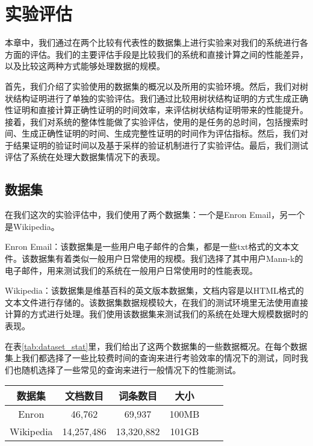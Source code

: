 \chapter{实验评估}
\label{chap:evaluation}
本章中，我们通过在两个比较有代表性的数据集上进行实验来对我们的系统进行各方面的评估。我们的主要评估手段是比较我们的系统和直接计算之间的性能差异，以及比较这两种方式能够处理数据的规模。

首先，我们介绍了实验使用的数据集的概况以及所用的实验环境。然后，我们对树状结构证明进行了单独的实验评估。我们通过比较用树状结构证明的方式生成正确性证明和直接计算正确性证明的时间效率，来评估树状结构证明带来的性能提升。接着，我们对系统的整体性能做了实验评估，使用的是任务的总时间，包括搜索时间、生成正确性证明的时间、生成完整性证明的时间作为评估指标。然后，我们对于结果证明的验证时间以及基于采样的验证机制进行了实验评估。最后，我们测试评估了系统在处理大数据集情况下的表现。

\section{数据集}

在我们这次的实验评估中，我们使用了两个数据集：一个是Enron Email，另一个是Wikipedia。

Enron Email：该数据集是一些用户电子邮件的合集，都是一些txt格式的文本文件。该数据集有着类似一般用户日常使用的规模。我们选择了其中用户Mann-k的电子邮件，用来测试我们的系统在一般用户日常使用时的性能表现。

Wikipedia：该数据集是维基百科的英文版本数据集，文档内容是以HTML格式的文本文件进行存储的。该数据集数据规模较大，在我们的测试环境里无法使用直接计算的方式进行处理。我们使用该数据集来测试我们的系统在处理大规模数据时的表现。

在表\ref{tab:dataset_stat}里，我们给出了这两个数据集的一些数据概况。在每个数据集上我们都选择了一些比较费时间的查询来进行考验效率的情况下的测试，同时我们也随机选择了一些常见的查询来进行一般情况下的性能测试。
\begin{table}[htb]
    \centering
    \begin{tabular}{cccccc}
        \toprule
        数据集 & 文档数目 & 词条数目 & 大小 \\
        \midrule
        Enron & 46,762 & 69,937 & 100MB  \\
        Wikipedia & 14,257,486 & 13,320,882 & 101GB  \\
        \bottomrule
    \end{tabular}
\end{table}

